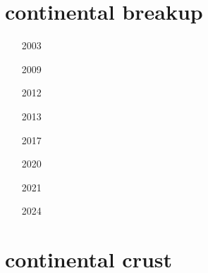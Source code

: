 \section{continental breakup} 

\begin{small}
\begin{itemize}
\item[2003] 
\item[2009]  
\item[2012] 
\item[2013] 
\item[2017]  \\ 
\item[2020]  \\ 
\item[2021]  
\item[2024] 
\end{itemize}
\end{small}


\section{continental crust} 

\begin{small}
\begin{itemize}
\item[\nineteeneightysix] 
 \\
\item[\nineteeneightynine] 
\item[\nineteenninetyfour] 
\item[\twothousandone] 
\item[\twothousandfour] 
\item[\twothousandthirteen] 
 \\ 
\item[\twothousandnineteen] 
\end{itemize}
\end{small}

